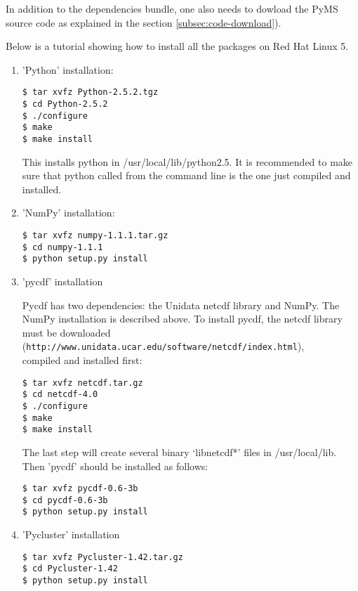 In addition to the dependencies bundle, one also needs to dowload the
PyMS source code as explained in the section \ref{subsec:code-download}).

Below is a tutorial showing how to install all the packages on Red Hat
Linux 5.

\begin{enumerate}

\item 'Python' installation:

\begin{verbatim}
$ tar xvfz Python-2.5.2.tgz
$ cd Python-2.5.2
$ ./configure
$ make
$ make install
\end{verbatim}

\noindent
This installs python in /usr/local/lib/python2.5. It is recommended
to make sure that python called from the command line is the one
just compiled and installed.

\item 'NumPy' installation:

\begin{verbatim}
$ tar xvfz numpy-1.1.1.tar.gz
$ cd numpy-1.1.1
$ python setup.py install
\end{verbatim}

\item 'pycdf' installation

Pycdf has two dependencies: the Unidata netcdf library and NumPy. The
NumPy installation is described above. To install pycdf, the netcdf
library must be downloaded\\
({\tt http://www.unidata.ucar.edu/software/netcdf/index.html}),\\
compiled and installed first:

\begin{verbatim}
$ tar xvfz netcdf.tar.gz
$ cd netcdf-4.0
$ ./configure
$ make
$ make install
\end{verbatim}

The last step will create several binary `libnetcdf*' files in
/usr/local/lib. Then 'pycdf' should be installed as follows:

\begin{verbatim}
$ tar xvfz pycdf-0.6-3b
$ cd pycdf-0.6-3b
$ python setup.py install
\end{verbatim}

\item 'Pycluster' installation

\begin{verbatim}
$ tar xvfz Pycluster-1.42.tar.gz
$ cd Pycluster-1.42
$ python setup.py install
\end{verbatim}


\end{enumerate}
